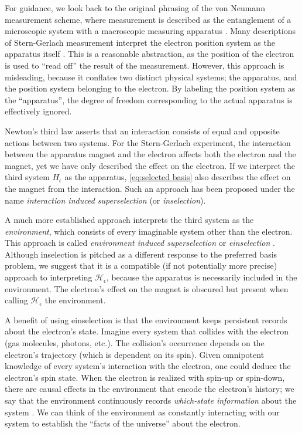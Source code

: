 For guidance, we look back to the original phrasing of the von Neumann measurement scheme, where measurement is described as the entanglement of a microscopic system with a macroscopic measuring apparatus \cite{Neumann}. Many descriptions of Stern-Gerlach measurement interpret the electron position system as the apparatus itself \cite{Venugopalan}. This is a reasonable abstraction, as the position of the electron is used to ``read off'' the result of the measurement. However, this approach is misleading, because it conflates two distinct physical systems; the apparatus, and the position system belonging to the electron. By labeling the position system as the ``apparatus'', the degree of freedom corresponding to the actual apparatus is effectively ignored.

Newton's third law asserts that an interaction consists of equal and opposite actions between two systems. For the Stern-Gerlach experiment, the interaction between the apparatus magnet and the electron affects both the electron and the magnet, yet we have only described the effect on the electron. If we interpret the third system $H_\epsilon$ as the apparatus, \autoref{eq:selected basis} also describes the effect on the magnet from the interaction. Such an approach has been proposed under the name \textit{interaction induced superselection} (or \textit{inselection})\cite{Wang}.

A much more established approach interprets the third system as the \textit{environment}, which consists of every imaginable system other than the electron. This approach is called \textit{environment induced superselection} or \textit{einselection} \cite{Zurek}. Although inselection is pitched as a different response to the preferred basis problem, we suggest that it is a compatible (if not potentially more precise) approach to interpreting $\mathcal{H}_\epsilon$, because the apparatus is necessarily included in the environment. The electron's effect on the magnet is obscured but present when calling $\mathcal{H}_\epsilon$ the environment.

A benefit of using einselection is that the environment keeps persistent records about the electron's state. Imagine every system that collides with the electron (gas molecules, photons, etc.). The collision's occurrence depends on the electron's trajectory (which is dependent on its spin). Given omnipotent knowledge of every system's interaction with the electron, one could deduce the electron's spin state. When the electron is realized with spin-up or spin-down, there are causal effects in the environment that encode the electron's history; we say that the environment continuously records \textit{which-state information} about the system \cite{Schlosshauer}. We can think of the environment as constantly interacting with our system to establish the ``facts of the universe'' about the electron.

